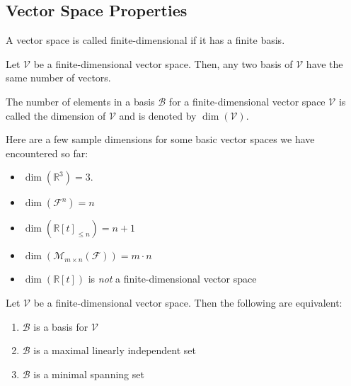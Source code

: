 \subsection{Vector Space Properties}\label{subsec-vector-space-properties}

\begin{definition}\label{def-finite-dimensional-vector-space}
	A vector space is called finite-dimensional if it has a finite basis.
\end{definition}

\begin{thm}\label{thm-vector-space-dimension}
	Let $\mathcal{V}$ be a finite-dimensional vector space. Then, any two basis
	of $\mathcal{V}$ have the same number of vectors.
\end{thm}

\begin{definition}\label{def-vector-space-dimension}
	The number of elements in a basis $\mathcal{B}$ for a finite-dimensional
	vector space $\mathcal{V}$ is called the dimension of $\mathcal{V}$ and is
	denoted by $\dim(\mathcal{V})$.
\end{definition}

\begin{exm}
	Here are a few sample dimensions for some basic vector spaces we have
	encountered so far:
	\begin{itemize}
		\item $\dim(\mathbb{R}^3)=3$.
		\item $\dim(\mathcal{F}^n)=n$
		\item $\dim(\mathbb{R}[t]_{\leq n})=n+1$
		\item $\dim(\mathcal{M}_{m \times n}(\mathcal{F}))=m\cdot n$
		\item $\dim(\mathbb{R}[t])$ is \textit{not} a finite-dimensional vector space
	\end{itemize}
\end{exm}

\begin{thm}\label{thm-vector-base-properties}
	Let $\mathcal{V}$ be a finite-dimensional vector space. Then the following are
	equivalent:
	\begin{enumerate}
		\item $\mathcal{B}$ is a basis for $\mathcal{V}$\label{thm-vector-base-properties:1}
		\item $\mathcal{B}$ is a maximal linearly independent set\label{thm-vector-base-properties:2}
		\item $\mathcal{B}$ is a minimal spanning set\label{thm-vector-base-properties:3}
	\end{enumerate}
\end{thm}

